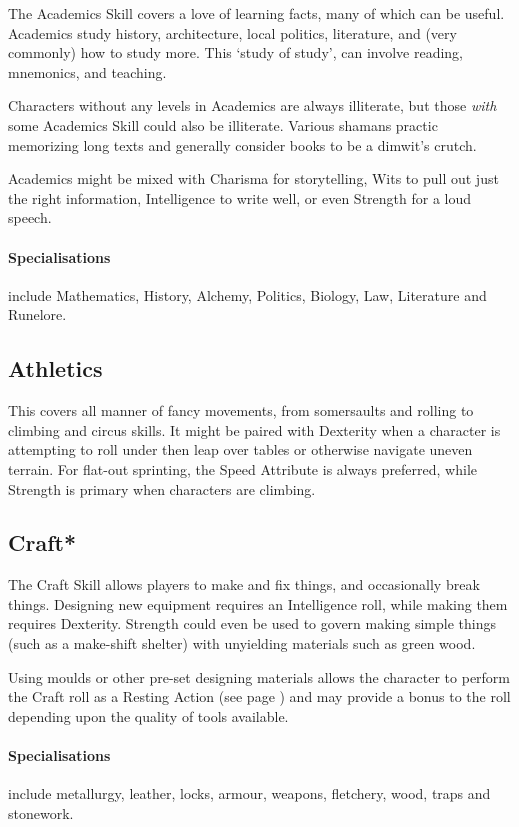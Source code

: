 \begin{multicols}{2}
The Academics Skill covers a love of learning facts, many of which can be useful.
Academics study history, architecture, local politics, literature, and (very commonly) how to study more.
This `study of study', can involve reading, mnemonics, and teaching.

Characters without any levels in Academics are always illiterate, but those \emph{with} some Academics Skill could also be illiterate.
Various shamans practic memorizing long texts and generally consider books to be a dimwit's crutch.

Academics might be mixed with Charisma for storytelling, Wits to pull out just the right information, Intelligence to write well, or even Strength for a loud speech.

\paragraph{Specialisations} include Mathematics, History, Alchemy, Politics, Biology, Law, Literature and Runelore.

\subsection{Athletics}

This covers all manner of fancy movements, from somersaults and rolling to climbing and circus skills. It might be paired with Dexterity when a character is attempting to roll under then leap over tables or otherwise navigate uneven terrain. For flat-out sprinting, the Speed Attribute is always preferred, while Strength is primary when characters are climbing.

\subsection{Craft*}

The Craft Skill allows players to make and fix things, and occasionally break things.
Designing new equipment requires an Intelligence roll, while making them requires Dexterity.
Strength could even be used to govern making simple things (such as a make-shift shelter) with unyielding materials such as green wood.

Using moulds or other pre-set designing materials allows the character to perform the Craft roll as a Resting Action (see page \pageref{restingactions}) and may provide a bonus to the roll depending upon the quality of tools available.

\paragraph{Specialisations} include metallurgy, leather, locks, armour, weapons, fletchery, wood, traps and stonework.


\end{multicols}
